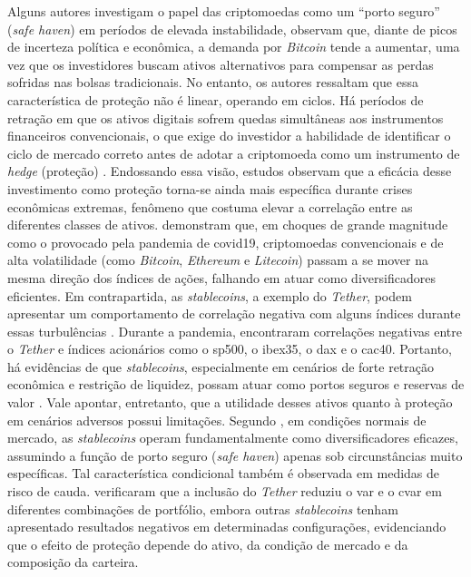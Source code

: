 Alguns autores investigam o papel das criptomoedas como um ``porto seguro'' (\textit{safe haven}) em períodos de elevada instabilidade,  observam que, diante de picos de incerteza política e econômica, a demanda por \textit{Bitcoin} tende a aumentar, uma vez que os investidores buscam ativos alternativos para compensar as perdas sofridas nas bolsas tradicionais. No entanto, os autores ressaltam que essa característica de proteção não é linear, operando em ciclos. Há períodos de retração em que os ativos digitais sofrem quedas simultâneas aos instrumentos financeiros convencionais, o que exige do investidor a habilidade de identificar o ciclo de mercado correto antes de adotar a criptomoeda como um instrumento de \textit{hedge} (proteção) \cite{umar2021bitcoin}. Endossando essa visão, estudos observam que a eficácia desse investimento como proteção torna-se ainda mais específica durante crises econômicas extremas, fenômeno que costuma elevar a correlação entre as diferentes classes de ativos.  demonstram que, em choques de grande magnitude como o provocado pela pandemia de \acs{covid19}, criptomoedas convencionais e de alta volatilidade (como \textit{Bitcoin}, \textit{Ethereum} e \textit{Litecoin}) passam a se mover na mesma direção dos índices de ações, falhando em atuar como diversificadores eficientes. Em contrapartida, as \textit{stablecoins}, a exemplo do \textit{Tether}, podem apresentar um comportamento de correlação negativa com alguns índices durante essas turbulências \cite{goodell2021diversifying}. Durante a pandemia,  encontraram correlações negativas entre o \textit{Tether} e índices acionários como o \acs{sp500}, o \ac{ibex35}, o \ac{dax} e o \ac{cac40}. Portanto, há evidências de que \textit{stablecoins}, especialmente em cenários de forte retração econômica e restrição de liquidez, possam atuar como portos seguros e reservas de valor \cite{goodell2021diversifying}. Vale apontar, entretanto, que a utilidade desses ativos quanto à proteção em cenários adversos possui limitações. Segundo , em condições normais de mercado, as \textit{stablecoins} operam fundamentalmente como diversificadores eficazes, assumindo a função de porto seguro (\textit{safe haven}) apenas sob circunstâncias muito específicas. Tal característica condicional também é observada em medidas de risco de cauda.  verificaram que a inclusão do \textit{Tether} reduziu o \ac{var} e o \ac{cvar} em diferentes combinações de portfólio, embora outras \textit{stablecoins} tenham apresentado resultados negativos em determinadas configurações, evidenciando que o efeito de proteção depende do ativo, da condição de mercado e da composição da carteira.


